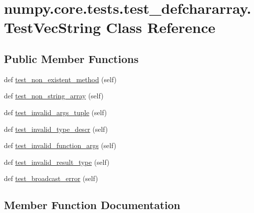 \hypertarget{classnumpy_1_1core_1_1tests_1_1test__defchararray_1_1TestVecString}{}\section{numpy.\+core.\+tests.\+test\+\_\+defchararray.\+Test\+Vec\+String Class Reference}
\label{classnumpy_1_1core_1_1tests_1_1test__defchararray_1_1TestVecString}
\subsection*{Public Member Functions}
\begin{DoxyCompactItemize}
\item 
def \hyperlink{classnumpy_1_1core_1_1tests_1_1test__defchararray_1_1TestVecString_a1ccce7bed6ff123f96a3ee2184c7ada6}{test\+\_\+non\+\_\+existent\+\_\+method} (self)
\item 
def \hyperlink{classnumpy_1_1core_1_1tests_1_1test__defchararray_1_1TestVecString_a44ebda0d54deae950f3814149bc1ae4d}{test\+\_\+non\+\_\+string\+\_\+array} (self)
\item 
def \hyperlink{classnumpy_1_1core_1_1tests_1_1test__defchararray_1_1TestVecString_a972fa480d3bb0ed98f849f3d71560d6c}{test\+\_\+invalid\+\_\+args\+\_\+tuple} (self)
\item 
def \hyperlink{classnumpy_1_1core_1_1tests_1_1test__defchararray_1_1TestVecString_ab20e26be68ca08d5f92d622b5933469d}{test\+\_\+invalid\+\_\+type\+\_\+descr} (self)
\item 
def \hyperlink{classnumpy_1_1core_1_1tests_1_1test__defchararray_1_1TestVecString_a172719a03d7eaa3aaa4b20c586f9da95}{test\+\_\+invalid\+\_\+function\+\_\+args} (self)
\item 
def \hyperlink{classnumpy_1_1core_1_1tests_1_1test__defchararray_1_1TestVecString_ab79ba0639ea68a29438960b17a057606}{test\+\_\+invalid\+\_\+result\+\_\+type} (self)
\item 
def \hyperlink{classnumpy_1_1core_1_1tests_1_1test__defchararray_1_1TestVecString_a9ff9f1dd48cb42ba7cd2c5fbdb5e885b}{test\+\_\+broadcast\+\_\+error} (self)
\end{DoxyCompactItemize}


\subsection{Member Function Documentation}
\mbox{\label{classnumpy_1_1core_1_1tests_1_1test__defchararray_1_1TestVecString_a9ff9f1dd48cb42ba7cd2c5fbdb5e885b}} 

